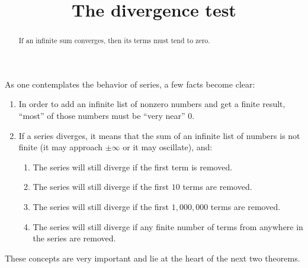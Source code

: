\documentclass{ximera}
\title[Dig-In:]{The divergence test}
\begin{document}
\begin{abstract}
If an infinite sum converges, then its terms must tend to zero.
\end{abstract}
\maketitle


As one contemplates the behavior of series, a few facts become clear:
\begin{enumerate}
\item In order to add an infinite list of nonzero numbers and get a
  finite result, ``most'' of those numbers must be ``very near'' $0$.
\item If a series diverges, it means that the sum of an infinite list
  of numbers is not finite (it may approach $\pm \infty$ or it may
  oscillate), and:
  \begin{enumerate}
  \item The series will still diverge if the first term is removed.
  \item The series will still diverge if the first $10$ terms are
    removed.
  \item The series will still diverge if the first $1,000,000$ terms
    are removed.
  \item The series will still diverge if any finite number of terms
    from anywhere in the series are removed.
  \end{enumerate}
\end{enumerate}

These concepts are very important and lie at the heart of the next two
theorems.
\end{document}
